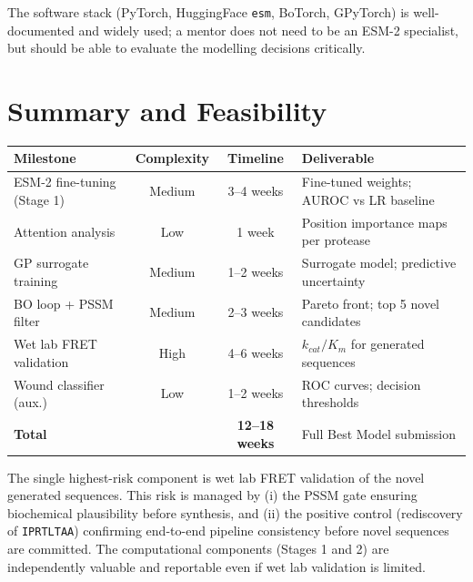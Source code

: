 \documentclass[10pt,a4paper]{article}
\newcommand{\seq}[1]{\texttt{#1}}
\begin{document}
The software stack (PyTorch, HuggingFace \texttt{esm}, BoTorch, GPyTorch)
is well-documented and widely used; a mentor does not need to be an ESM-2
specialist, but should be able to evaluate the modelling decisions critically.

\section{Summary and Feasibility}

\begin{center}
\small
\begin{tabular}{lccl}
  \toprule
  Milestone & Complexity & Timeline & Deliverable\\
  \midrule
  ESM-2 fine-tuning (Stage 1) & Medium & 3--4 weeks & Fine-tuned weights; AUROC vs LR baseline\\
  Attention analysis          & Low    & 1 week     & Position importance maps per protease\\
  GP surrogate training       & Medium & 1--2 weeks & Surrogate model; predictive uncertainty\\
  BO loop + PSSM filter       & Medium & 2--3 weeks & Pareto front; top 5 novel candidates\\
  Wet lab FRET validation     & High   & 4--6 weeks & $k_{cat}/K_m$ for generated sequences\\
  Wound classifier (aux.)     & Low    & 1--2 weeks & ROC curves; decision thresholds\\
  \midrule
  \textbf{Total}              &        & \textbf{12--18 weeks} & Full Best Model submission\\
  \bottomrule
\end{tabular}
\end{center}

\medskip
The single highest-risk component is wet lab FRET validation of the novel
generated sequences.  This risk is managed by (i) the PSSM gate ensuring
biochemical plausibility before synthesis, and (ii) the positive control
(rediscovery of \seq{IPRTLTAA}) confirming end-to-end pipeline consistency
before novel sequences are committed.  The computational components
(Stages 1 and 2) are independently valuable and reportable even if wet
lab validation is limited.
\end{document}
